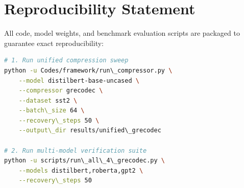 \section{Reproducibility Statement}
All code, model weights, and benchmark evaluation scripts are packaged to guarantee exact reproducibility:
\begin{lstlisting}[language=bash]
# 1. Run unified compression sweep
python -u Codes/framework/run\_compressor.py \
    --model distilbert-base-uncased \
    --compressor grecodec \
    --dataset sst2 \
    --batch\_size 64 \
    --recovery\_steps 50 \
    --output\_dir results/unified\_grecodec

# 2. Run multi-model verification suite
python -u scripts/run\_all\_4\_grecodec.py \
    --models distilbert,roberta,gpt2 \
    --recovery\_steps 50
\end{lstlisting}
